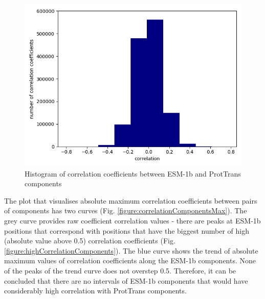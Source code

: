 \documentclass[12pt]{article}
\begin{document}
	\newpage

	\begin{figure}[h!]
		\centering
		\includegraphics[scale=0.85]{validation_small_set_2_joined_correlation_hist.png}

		\caption{Histogram of correlation coefficients between ESM-1b 
		and ProtTrans components}
		\label{figure:correlationComponentsHisto}
	\end{figure}

	\newpage

	The plot that visualises absolute maximum correlation coefficients between 
	pairs of components has two curves (Fig. \ref{figure:correlationComponentsMax}). 
	The grey curve provides raw coefficient correlation values - there are peaks 
	at ESM-1b positions that correspond with positions that have the 
	biggest number of high (absolute value above 0.5) correlation coefficients
	(Fig. \ref{figure:highCorrelationComponents}). The blue curve shows the trend 
	of absolute maximum values of correlation coefficients along the ESM-1b components.
	None of the peaks of the trend curve does not overstep 0.5. Therefore, it can 
	be concluded that there are no intervals of ESM-1b components that would have 
	considerably high correlation with ProtTrans components.
\end{document}
